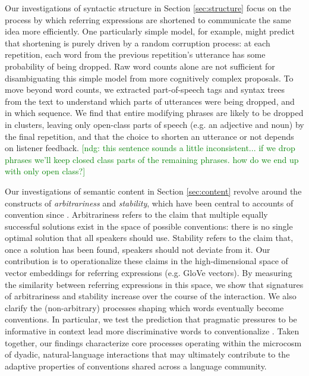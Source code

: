 \documentclass[alpha-refs]{wiley-article}
\newcommand{\ndg}[1]{\textcolor{green}{[ndg: #1]}}
\begin{document}
Our investigations of syntactic structure in Section \ref{sec:structure} focus on the process by which referring expressions are shortened to communicate the same idea more efficiently.
One particularly simple model, for example, might predict that shortening is purely driven by a random corruption process: at each repetition, each word from the previous repetition's utterance has some probability of being dropped.
Raw word counts alone are not sufficient for disambiguating this simple model from more cognitively complex proposals.
To move beyond word counts, we extracted part-of-speech tags and syntax trees from the text to understand which parts of utterances were being dropped, and in which sequence.
We find that entire modifying phrases are likely to be dropped in clusters, leaving only open-class parts of speech (e.g. an adjective and noun) by the final repetition, and that the choice to shorten an utterance or not depends on listener feedback. \ndg{this sentence sounds a little inconsistent... if we drop phrases we'll keep closed class parts of the remaining phrases. how do we end up with only open class?}

Our investigations of semantic content in Section \ref{sec:content} revolve around the constructs of \emph{arbitrariness} and \emph{stability}, which have been central to accounts of convention since \cite{Lewis69_Convention}.
Arbitrariness refers to the claim that multiple equally successful solutions exist in the space of possible conventions: there is no single optimal solution that all speakers should use.
Stability refers to the claim that, once a solution has been found, speakers should not deviate from it.
Our contribution is to operationalize these claims in the high-dimensional space of vector embeddings for referring expressions (e.g. GloVe vectors).
By measuring the similarity between referring expressions in this space, we show that signatures of arbitrariness and stability increase over the course of the interaction.
We also clarify the (non-arbitrary) processes shaping which words eventually become conventions.
In particular, we test the prediction that pragmatic pressures to be informative in context lead more discriminative words to conventionalize \citep{KirbyTamarizCornishSmith15_CompressionCommunication,GibsonEtAl17_ColorNamingUse,hawkins_emerging_abstractions_2018}. 
Taken together, our findings characterize core processes operating within the microcosm of dyadic, natural-language interactions that may ultimately contribute to the adaptive properties of conventions shared across a language community.
\end{document}
